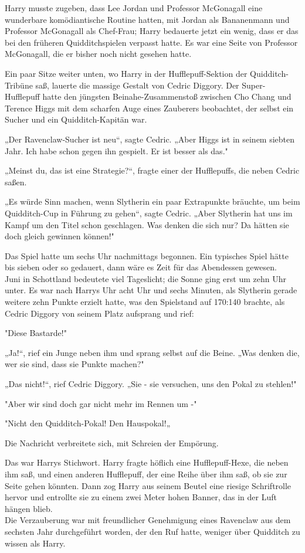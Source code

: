 {Harry musste zugeben, dass Lee Jordan und Professor McGonagall eine wunderbare komödiantische Routine hatten, mit Jordan als Bananenmann und Professor McGonagall als Chef-Frau; Harry bedauerte jetzt ein wenig, dass er das bei den früheren Quidditchspielen verpasst hatte. Es war eine Seite von Professor McGonagall, die er bisher noch nicht gesehen hatte.

Ein paar Sitze weiter unten, wo Harry in der Hufflepuff-Sektion der Quidditch-Tribüne saß, lauerte die massige Gestalt von Cedric Diggory. Der Super-Hufflepuff hatte den jüngsten Beinahe-Zusammenstoß zwischen Cho Chang und Terence Higgs mit dem scharfen Auge eines Zauberers beobachtet, der selbst ein Sucher und ein Quidditch-Kapitän war.

„Der Ravenclaw-Sucher ist neu“, sagte Cedric. „Aber Higgs ist in seinem siebten Jahr. Ich habe schon gegen ihn gespielt. Er ist besser als das."

„Meinst du, das ist eine Strategie?“, fragte einer der Hufflepuffs, die neben Cedric saßen.

„Es würde Sinn machen, wenn Slytherin ein paar Extrapunkte bräuchte, um beim Quidditch-Cup in Führung zu gehen“, sagte Cedric. „Aber Slytherin hat uns im Kampf um den Titel schon geschlagen. Was denken die sich nur? Da hätten sie doch gleich gewinnen können!"

Das Spiel hatte um sechs Uhr nachmittags begonnen. Ein typisches Spiel hätte bis sieben oder so gedauert, dann wäre es Zeit für das Abendessen gewesen.\\ Juni in Schottland bedeutete viel Tageslicht; die Sonne ging erst um zehn Uhr unter. Es war nach Harrys Uhr acht Uhr und sechs Minuten, als Slytherin gerade weitere zehn Punkte erzielt hatte, was den Spielstand auf 170:140 brachte, als Cedric Diggory von seinem Platz aufsprang und rief:

"Diese Bastarde!"

„Ja!“, rief ein Junge neben ihm und sprang selbst auf die Beine. „Was denken die, wer sie sind, dass sie Punkte machen?"

„Das nicht!“, rief Cedric Diggory. „Sie - sie versuchen, uns den Pokal zu stehlen!"

"Aber wir sind doch gar nicht mehr im Rennen um -"

"Nicht den Quidditch-Pokal! Den Hauspokal!„

Die Nachricht verbreitete sich, mit Schreien der Empörung.

Das war Harrys Stichwort. Harry fragte höflich eine Hufflepuff-Hexe, die neben ihm saß, und einen anderen Hufflepuff, der eine Reihe über ihm saß, ob sie zur Seite gehen könnten. Dann zog Harry aus seinem Beutel eine riesige Schriftrolle hervor und entrollte sie zu einem zwei Meter hohen Banner, das in der Luft hängen blieb.\\ Die Verzauberung war mit freundlicher Genehmigung eines Ravenclaw aus dem sechsten Jahr durchgeführt worden, der den Ruf hatte, weniger über Quidditch zu wissen als Harry.

}
